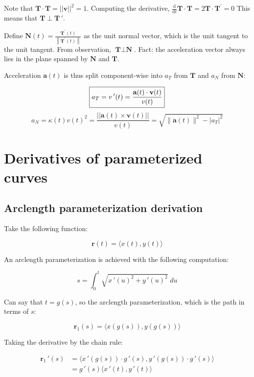 Note that $\textbf{T}\cdot \textbf{T}=||\textbf{v}||^2=1$.
Computing the derivative, $\frac{\mathrm{d}}{\mathrm{d} t} \textbf{T} \cdot \textbf{T}=2 \textbf{T} \cdot \textbf{T}^{\prime}=0$
This means that $\textbf{T}\perp \textbf{T}\,'$.\newline

\noindent
Define $\boxed{\textbf{N}(t)=\frac{\textbf{T}^{\prime}(t)}{\left\|\textbf{T}^{\prime}(t)\right\|}}$ as
the unit normal vector, which is the unit tangent to the unit tangent. From observation, $\textbf{T}\perp \textbf{N}$.
Fact: the acceleration vector always lies in the plane spanned by $\textbf{N}$ and $\textbf{T}$.\newline

\noindent
Acceleration $\textbf{a}(t)$ is thus split component-wise into $a_T$ from $\textbf{T}$
and $a_N$ from $\textbf{N}$:

\[\boxed{a_T=v\,'(t)=\frac{\textbf a(t)\cdot \textbf{v}(t)}{v(t)}}\]
\[\boxed{a_N=\kappa(t)v(t)^2=\frac{||\textbf{a}(t)\times \textbf{v}(t)||}{v(t)}=\sqrt{\|\textbf{a}(t)\|^{2}-\left|a_{T}\right|^{2}}}\]

\section{Derivatives of parameterized curves}

\subsection{Arclength parameterization derivation}

Take the following function:

\[\textbf{r}(t)=\langle x(t),y(t) \rangle\]

An arclength parameterization is achieved with the following computation:

\[s=\int_0^t \sqrt{x\,'(u)^2+y\,'(u)^2}\;du\]

Can say that $t=g(s)$, so the arclength parameterization, which is the path in terms of $s$:

\[\textbf{r}_1(s)=\langle x(g(s)),y(g(s))\rangle\]

Taking the derivative by the chain rule:

\begin{align*}
    \textbf{r}_1\,'(s)&=\langle x\,'(g(s))\cdot g\,'(s),y\,'(g(s))\cdot g\,'(s)\rangle \\
    &=g\,'(s)\langle x\,'(t),y\,'(t) \rangle \\
\end{align*}

